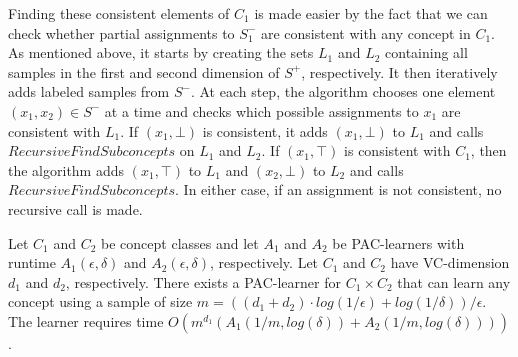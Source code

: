 Finding these consistent elements of $C_1$ is made easier by the fact that we can check whether partial assignments to $S^-_1$ are consistent with any concept in $C_1$. 
As mentioned above, it starts by creating the sets $L_1$ and $L_2$ containing all samples in the first and second dimension of $S^+$, respectively.
It then iteratively adds labeled samples from $S^-$.
At each step, the algorithm chooses one element $(x_1, x_2) \in S^-$ at a time and checks which possible assignments to $x_1$ are consistent with $L_1$.
If $(x_1, \bot)$ is consistent, it adds $(x_1, \bot)$ to $L_1$ and calls $RecursiveFindSubconcepts$ on $L_1$ and $L_2$.
If $(x_1, \top)$ is consistent with $C_1$, then the algorithm adds $(x_1, \top)$ to $L_1$ and $(x_2, \bot)$ to $L_2$ and calls $RecursiveFindSubconcepts$.
In either case, if an assignment is not consistent, no recursive call is made. 




\begin{theorem}
Let $C_1$ and $C_2$ be concept classes and let $A_1$ and $A_2$ be PAC-learners with runtime $A_1(\epsilon, \delta)$ and $A_2(\epsilon, \delta)$, respectively. 
Let $C_1$ and $C_2$ have VC-dimension $d_1$ and $d_2$, respectively.
There exists a PAC-learner for $C_1 \times C_2$ that can learn any concept using a sample of size $m = ((d_1 + d_2) \cdot log(1/\epsilon) + log(1/\delta))/\epsilon$.
The learner requires time $O(m^{d_1}(A_1(1/m, log(\delta)) +  A_2(1/m, log(\delta))))$.
\end{theorem}






